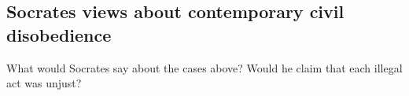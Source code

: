 \documentclass[oneside]{article}
\begin{document}
\subsection*{Socrates views about contemporary civil disobedience}
 What would Socrates say about the cases above? Would he claim that each illegal act was unjust? 




\end{document}
